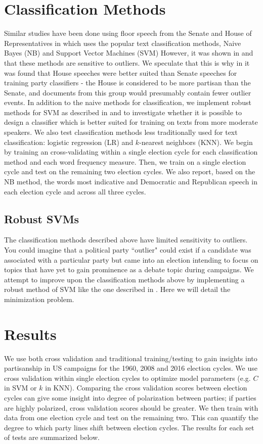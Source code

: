 \documentclass[aps, prl, reprint, showpacs]{revtex4-1}
\begin{document}
\section{Classification Methods}
Similar studies have been done using floor speech from the Senate and House of Representatives in \cite{yu} which uses the popular text classification methods, Naive Bayes (NB) and Support Vector Machines (SVM) However, it was shown in \cite{kwon} and \cite{thomas} that these methods are sensitive to outliers. We speculate that this is why in \cite{yu} it was found that House speeches were better suited than Senate speeches for training party classifiers - the House is considered to be more partisan than the Senate, and documents from this group would presumably contain fewer outlier events. In addition to the naive methods for classification, we implement robust methods for SVM  as described in \cite{chandra} and \cite{xu} to investigate whether it is possible to design a classifier which is better suited for training on texts from more moderate speakers. We also test classification methods less traditionally used for text classification: logistic regression (LR) and $k$-nearest neighbors (KNN). We begin by training an cross-validating within a single election cycle for each classification method and each word frequency measure.  Then, we train on a single election cycle and test on the remaining two election cycles. We also report, based on the NB method, the words most indicative and Democratic and Republican speech in each election cycle and across all three cycles.

\subsection{Robust SVMs}
The classification methods described above have limited sensitivity to outliers. You could imagine that a political party ``outlier" could exist if a candidate was associated with a particular party but came into an election intending to focus on topics that have yet to gain prominence as a debate topic during campaigns. We attempt to improve upon the classification methods above by implementing a robust method of SVM like the one described in \cite{xu}. Here we will detail the minimization problem.


\section{Results}

We use both cross validation and traditional training/testing to gain insights into partisanship in US campaigns for the 1960, 2008 and 2016 election cycles. We use cross validation within single election cycles to optimize model parameters (e.g. $C$ in SVM or $k$ in KNN). Comparing the cross validation scores between election cycles can give some insight into degree of polarization between parties; if parties are highly polarized, cross validation scores should be greater. We then train with data from one election cycle and test on the remaining two. This can quantify the degree to which party lines shift between election cycles. The results for each set of tests are summarized below.
\end{document}
